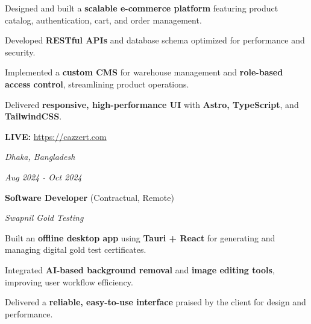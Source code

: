     \vspace{0.10 cm}
    \begin{onecolentry}
        \begin{highlights}
            \item Designed and built a \textbf{scalable e-commerce platform} featuring product catalog, authentication, cart, and order management.
            \item Developed \textbf{RESTful APIs} and database schema optimized for performance and security.
            \item Implemented a \textbf{custom CMS} for warehouse management and \textbf{role-based access control}, streamlining product operations.
            \item Delivered \textbf{responsive, high-performance UI} with \textbf{Astro, TypeScript}, and \textbf{TailwindCSS}.
            \item \textbf{LIVE:} \url{https://cazzert.com}
        \end{highlights}
    \end{onecolentry}


    \vspace{0.10 cm}

    \begin{twocolentry}{
    \textit{Dhaka, Bangladesh}

    \textit{Aug 2024 - Oct 2024}}
        \textbf{Software Developer} (Contractual, Remote)
        
        \textit{Swapnil Gold Testing}
    \end{twocolentry}

    \vspace{0.10 cm}
    \begin{onecolentry}
        \begin{highlights}
            \item Built an \textbf{offline desktop app} using \textbf{Tauri + React} for generating and managing digital gold test certificates.
            \item Integrated \textbf{AI-based background removal} and \textbf{image editing tools}, improving user workflow efficiency.
            \item Delivered a \textbf{reliable, easy-to-use interface} praised by the client for design and performance.
        \end{highlights}
    \end{onecolentry}
